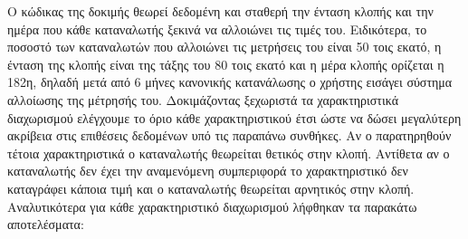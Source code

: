 Ο κώδικας της δοκιμής θεωρεί δεδομένη και σταθερή την ένταση κλοπής και την ημέρα που κάθε καταναλωτής ξεκινά να αλλοιώνει τις τιμές του. Ειδικότερα, το ποσοστό των καταναλωτών που αλλοιώνει τις μετρήσεις του είναι 50 τοις εκατό, η ένταση της κλοπής είναι της τάξης του 80 τοις εκατό και η μέρα κλοπής ορίζεται η 182η, δηλαδή μετά από 6 μήνες κανονικής κατανάλωσης ο χρήστης εισάγει σύστημα αλλοίωσης της μέτρησής του. Δοκιμάζοντας ξεχωριστά τα χαρακτηριστικά διαχωρισμού ελέγχουμε το όριο κάθε χαρακτηριστικού έτσι ώστε να δώσει μεγαλύτερη ακρίβεια στις επιθέσεις δεδομένων υπό τις παραπάνω συνθήκες. Αν ο παρατηρηθούν τέτοια χαρακτηριστικά ο καταναλωτής θεωρείται θετικός στην κλοπή. Αντίθετα αν ο καταναλωτής δεν έχει την αναμενόμενη συμπεριφορά το χαρακτηριστικό δεν καταγράφει κάποια τιμή και ο καταναλωτής θεωρείται αρνητικός στην κλοπή. Αναλυτικότερα για κάθε χαρακτηριστικό διαχωρισμού λήφθηκαν τα παρακάτω αποτελέσματα:
